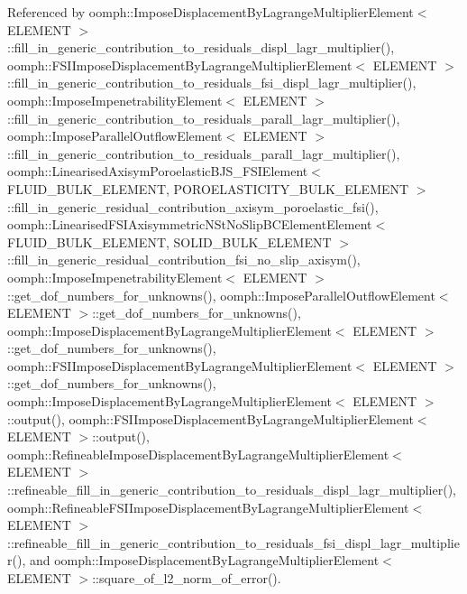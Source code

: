 Referenced by oomph\+::\+Impose\+Displacement\+By\+Lagrange\+Multiplier\+Element$<$ E\+L\+E\+M\+E\+N\+T $>$\+::fill\+\_\+in\+\_\+generic\+\_\+contribution\+\_\+to\+\_\+residuals\+\_\+displ\+\_\+lagr\+\_\+multiplier(), oomph\+::\+F\+S\+I\+Impose\+Displacement\+By\+Lagrange\+Multiplier\+Element$<$ E\+L\+E\+M\+E\+N\+T $>$\+::fill\+\_\+in\+\_\+generic\+\_\+contribution\+\_\+to\+\_\+residuals\+\_\+fsi\+\_\+displ\+\_\+lagr\+\_\+multiplier(), oomph\+::\+Impose\+Impenetrability\+Element$<$ E\+L\+E\+M\+E\+N\+T $>$\+::fill\+\_\+in\+\_\+generic\+\_\+contribution\+\_\+to\+\_\+residuals\+\_\+parall\+\_\+lagr\+\_\+multiplier(), oomph\+::\+Impose\+Parallel\+Outflow\+Element$<$ E\+L\+E\+M\+E\+N\+T $>$\+::fill\+\_\+in\+\_\+generic\+\_\+contribution\+\_\+to\+\_\+residuals\+\_\+parall\+\_\+lagr\+\_\+multiplier(), oomph\+::\+Linearised\+Axisym\+Poroelastic\+B\+J\+S\+\_\+\+F\+S\+I\+Element$<$ F\+L\+U\+I\+D\+\_\+\+B\+U\+L\+K\+\_\+\+E\+L\+E\+M\+E\+N\+T, P\+O\+R\+O\+E\+L\+A\+S\+T\+I\+C\+I\+T\+Y\+\_\+\+B\+U\+L\+K\+\_\+\+E\+L\+E\+M\+E\+N\+T $>$\+::fill\+\_\+in\+\_\+generic\+\_\+residual\+\_\+contribution\+\_\+axisym\+\_\+poroelastic\+\_\+fsi(), oomph\+::\+Linearised\+F\+S\+I\+Axisymmetric\+N\+St\+No\+Slip\+B\+C\+Element\+Element$<$ F\+L\+U\+I\+D\+\_\+\+B\+U\+L\+K\+\_\+\+E\+L\+E\+M\+E\+N\+T, S\+O\+L\+I\+D\+\_\+\+B\+U\+L\+K\+\_\+\+E\+L\+E\+M\+E\+N\+T $>$\+::fill\+\_\+in\+\_\+generic\+\_\+residual\+\_\+contribution\+\_\+fsi\+\_\+no\+\_\+slip\+\_\+axisym(), oomph\+::\+Impose\+Impenetrability\+Element$<$ E\+L\+E\+M\+E\+N\+T $>$\+::get\+\_\+dof\+\_\+numbers\+\_\+for\+\_\+unknowns(), oomph\+::\+Impose\+Parallel\+Outflow\+Element$<$ E\+L\+E\+M\+E\+N\+T $>$\+::get\+\_\+dof\+\_\+numbers\+\_\+for\+\_\+unknowns(), oomph\+::\+Impose\+Displacement\+By\+Lagrange\+Multiplier\+Element$<$ E\+L\+E\+M\+E\+N\+T $>$\+::get\+\_\+dof\+\_\+numbers\+\_\+for\+\_\+unknowns(), oomph\+::\+F\+S\+I\+Impose\+Displacement\+By\+Lagrange\+Multiplier\+Element$<$ E\+L\+E\+M\+E\+N\+T $>$\+::get\+\_\+dof\+\_\+numbers\+\_\+for\+\_\+unknowns(), oomph\+::\+Impose\+Displacement\+By\+Lagrange\+Multiplier\+Element$<$ E\+L\+E\+M\+E\+N\+T $>$\+::output(), oomph\+::\+F\+S\+I\+Impose\+Displacement\+By\+Lagrange\+Multiplier\+Element$<$ E\+L\+E\+M\+E\+N\+T $>$\+::output(), oomph\+::\+Refineable\+Impose\+Displacement\+By\+Lagrange\+Multiplier\+Element$<$ E\+L\+E\+M\+E\+N\+T $>$\+::refineable\+\_\+fill\+\_\+in\+\_\+generic\+\_\+contribution\+\_\+to\+\_\+residuals\+\_\+displ\+\_\+lagr\+\_\+multiplier(), oomph\+::\+Refineable\+F\+S\+I\+Impose\+Displacement\+By\+Lagrange\+Multiplier\+Element$<$ E\+L\+E\+M\+E\+N\+T $>$\+::refineable\+\_\+fill\+\_\+in\+\_\+generic\+\_\+contribution\+\_\+to\+\_\+residuals\+\_\+fsi\+\_\+displ\+\_\+lagr\+\_\+multiplier(), and oomph\+::\+Impose\+Displacement\+By\+Lagrange\+Multiplier\+Element$<$ E\+L\+E\+M\+E\+N\+T $>$\+::square\+\_\+of\+\_\+l2\+\_\+norm\+\_\+of\+\_\+error().

